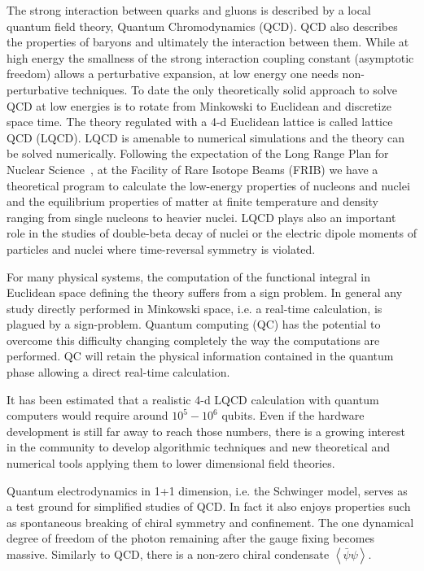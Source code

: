 \documentclass[10pt]{article}
\begin{document}
The strong interaction between quarks and gluons is
described by a local quantum field theory, Quantum Chromodynamics (QCD).
QCD also describes the properties of baryons and ultimately the interaction between them.
While at high energy the smallness of the
strong interaction coupling constant (asymptotic freedom) allows a perturbative
expansion, at low energy one needs non-perturbative techniques.
To date the only theoretically solid approach to solve QCD at low energies
is to rotate from Minkowski to Euclidean and discretize space time.
The theory regulated with a 4-d Euclidean lattice is called lattice QCD (LQCD).
LQCD is amenable to numerical simulations and the theory can be solved numerically.
Following the expectation of the Long Range Plan for Nuclear Science~\cite{Geesaman:2015fha},
at the Facility of Rare Isotope Beams (FRIB) we have a theoretical program
to calculate the low-energy properties of nucleons and nuclei and the equilibrium properties
of matter at finite temperature and density ranging from single nucleons to heavier nuclei.
LQCD plays also an important role in the studies of double-beta decay of nuclei
or the electric dipole moments of particles and nuclei
where time-reversal symmetry is violated.

For many physical systems, the computation of the
functional integral in Euclidean space defining the theory
suffers from a sign problem. In general any study directly
performed in Minkowski space, i.e. a real-time calculation,
is plagued by a sign-problem.
Quantum computing (QC) has the potential to overcome this difficulty
changing completely the way the computations are performed.
QC will retain the physical information contained in the quantum phase
allowing a direct real-time calculation.

It has been estimated that a realistic 4-d LQCD calculation with quantum computers
would require around $10^5 - 10^6$ qubits. Even if the hardware development is still
far away to reach those numbers, there is a growing interest in the community
to develop algorithmic techniques and new theoretical and numerical tools applying them
to lower dimensional field theories.

Quantum electrodynamics in 1+1 dimension, i.e. the Schwinger model,
serves as a test ground for simplified studies of QCD.
In fact it also enjoys properties such as
spontaneous breaking of chiral symmetry and confinement.
The one dynamical degree of freedom of the photon remaining
after the gauge fixing becomes massive.
Similarly to QCD, there is a non-zero
chiral condensate $\left\langle \bar\psi \psi \right\rangle$.
\end{document}
